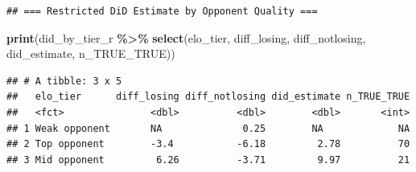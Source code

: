 \documentclass[
]{article}
\newenvironment{Shaded}{\begin{snugshade}}{\end{snugshade}}
\newcommand{\FunctionTok}[1]{\textcolor[rgb]{0.13,0.29,0.53}{\textbf{#1}}}
\newcommand{\NormalTok}[1]{#1}
\newcommand{\SpecialCharTok}[1]{\textcolor[rgb]{0.81,0.36,0.00}{\textbf{#1}}}
\begin{document}
\begin{verbatim}
## === Restricted DiD Estimate by Opponent Quality ===
\end{verbatim}

\begin{Shaded}
\begin{Highlighting}[]
\FunctionTok{print}\NormalTok{(did\_by\_tier\_r }\SpecialCharTok{\%\textgreater{}\%} \FunctionTok{select}\NormalTok{(elo\_tier, diff\_losing, diff\_notlosing,}
\NormalTok{                                did\_estimate, n\_TRUE\_TRUE))}
\end{Highlighting}
\end{Shaded}

\begin{verbatim}
## # A tibble: 3 x 5
##   elo_tier      diff_losing diff_notlosing did_estimate n_TRUE_TRUE
##   <fct>               <dbl>          <dbl>        <dbl>       <int>
## 1 Weak opponent       NA              0.25        NA             NA
## 2 Top opponent        -3.4           -6.18         2.78          70
## 3 Mid opponent         6.26          -3.71         9.97          21
\end{verbatim}
\end{document}
